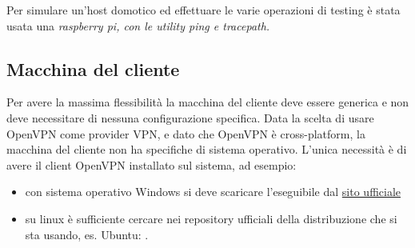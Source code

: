 Per simulare un'host domotico ed effettuare le varie operazioni di testing è stata usata una \it{raspberry pi}, con le utility \it{ping} e \it{tracepath}.

\subsection{Macchina del cliente}

Per avere la massima flessibilità la macchina del cliente deve essere generica e non deve necessitare di nessuna configurazione specifica. Data la scelta di usare OpenVPN come provider VPN, e dato che OpenVPN è cross-platform, la macchina del cliente non ha specifiche di sistema operativo. L'unica necessità è di avere il client OpenVPN installato sul sistema, ad esempio:


\begin{itemize}
	\item con sistema operativo Windows si deve scaricare l'eseguibile dal \href{https://openvpn.net/client-connect-vpn-for-windows/}{sito ufficiale}
	\item su linux è sufficiente cercare nei repository ufficiali della distribuzione che si sta usando, es. Ubuntu: .
\end{itemize}


